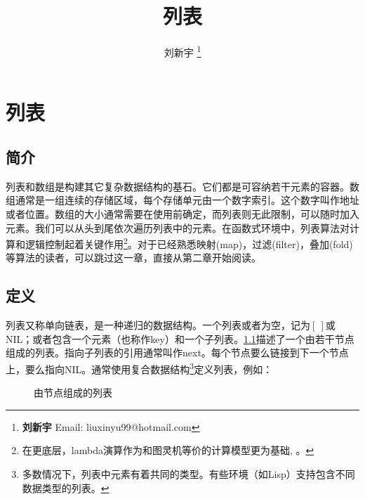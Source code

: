 \documentclass[b5paper]{ctexart}
\begin{document}
\title{列表}

\author{刘新宇
\thanks{{\bfseries 刘新宇} \newline
  Email: liuxinyu99@hotmail.com \newline}
  }

\maketitle
\fi


\ifx\wholebook\relax
\chapter{列表}
\fi

\section{简介}
\label{introduction}

列表和数组是构建其它复杂数据结构的基石。它们都是可容纳若干元素的容器。数组通常是一组连续的存储区域，每个存储单元由一个数字索引。这个数字叫作地址或者位置。数组的大小通常需要在使用前确定，而列表则无此限制，可以随时加入元素。我们可以从头到尾依次遍历列表中的元素。在函数式环境中，列表算法对计算和逻辑控制起着关键作用\footnote{在更底层，lambda演算作为和图灵机等价的计算模型更为基础\cite{mittype}, \cite{unplugged}。}。对于已经熟悉映射(map)，过滤(filter)，叠加(fold)等算法的读者，可以跳过这一章，直接从第二章开始阅读。

\section{定义}

列表又称单向链表，是一种递归的数据结构。一个列表或者为空，记为$[\ ]$或NIL；或者包含一个元素（也称作key）和一个子列表。\cref{fig:list-example}描述了一个由若干节点组成的列表。指向子列表的引用通常叫作next。每个节点要么链接到下一个节点上，要么指向NIL。通常使用复合数据结构\footnote{多数情况下，列表中元素有着共同的类型。有些环境（如Lisp）支持包含不同数据类型的列表。}定义列表，例如：

\begin{figure}[htbp]
  \centering
  \caption{由节点组成的列表}
  \label{fig:list-example}
\end{figure}
\end{document}
